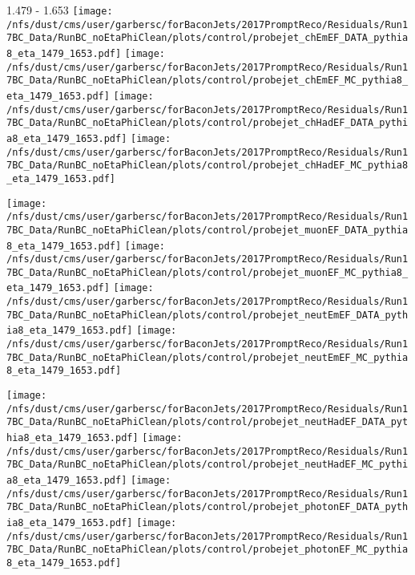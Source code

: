 \documentclass[t,compress]{beamer}
\begin{document}
\begin{frame}{1.479 - 1.653}
	\texttt{[image: /nfs/dust/cms/user/garbersc/forBaconJets/2017PromptReco/Residuals/Run17BC\_Data/RunBC\_noEtaPhiClean/plots/control/probejet\_chEmEF\_DATA\_pythia8\_eta\_1479\_1653.pdf]}
	\texttt{[image: /nfs/dust/cms/user/garbersc/forBaconJets/2017PromptReco/Residuals/Run17BC\_Data/RunBC\_noEtaPhiClean/plots/control/probejet\_chEmEF\_MC\_pythia8\_eta\_1479\_1653.pdf]}
	\texttt{[image: /nfs/dust/cms/user/garbersc/forBaconJets/2017PromptReco/Residuals/Run17BC\_Data/RunBC\_noEtaPhiClean/plots/control/probejet\_chHadEF\_DATA\_pythia8\_eta\_1479\_1653.pdf]}
	\texttt{[image: /nfs/dust/cms/user/garbersc/forBaconJets/2017PromptReco/Residuals/Run17BC\_Data/RunBC\_noEtaPhiClean/plots/control/probejet\_chHadEF\_MC\_pythia8\_eta\_1479\_1653.pdf]}
\newline

\vspace{-0.65cm}
	\texttt{[image: /nfs/dust/cms/user/garbersc/forBaconJets/2017PromptReco/Residuals/Run17BC\_Data/RunBC\_noEtaPhiClean/plots/control/probejet\_muonEF\_DATA\_pythia8\_eta\_1479\_1653.pdf]}
	\texttt{[image: /nfs/dust/cms/user/garbersc/forBaconJets/2017PromptReco/Residuals/Run17BC\_Data/RunBC\_noEtaPhiClean/plots/control/probejet\_muonEF\_MC\_pythia8\_eta\_1479\_1653.pdf]}
	\texttt{[image: /nfs/dust/cms/user/garbersc/forBaconJets/2017PromptReco/Residuals/Run17BC\_Data/RunBC\_noEtaPhiClean/plots/control/probejet\_neutEmEF\_DATA\_pythia8\_eta\_1479\_1653.pdf]}
	\texttt{[image: /nfs/dust/cms/user/garbersc/forBaconJets/2017PromptReco/Residuals/Run17BC\_Data/RunBC\_noEtaPhiClean/plots/control/probejet\_neutEmEF\_MC\_pythia8\_eta\_1479\_1653.pdf]}
\newline

\vspace{-0.65cm}
	\texttt{[image: /nfs/dust/cms/user/garbersc/forBaconJets/2017PromptReco/Residuals/Run17BC\_Data/RunBC\_noEtaPhiClean/plots/control/probejet\_neutHadEF\_DATA\_pythia8\_eta\_1479\_1653.pdf]}
	\texttt{[image: /nfs/dust/cms/user/garbersc/forBaconJets/2017PromptReco/Residuals/Run17BC\_Data/RunBC\_noEtaPhiClean/plots/control/probejet\_neutHadEF\_MC\_pythia8\_eta\_1479\_1653.pdf]}
	\texttt{[image: /nfs/dust/cms/user/garbersc/forBaconJets/2017PromptReco/Residuals/Run17BC\_Data/RunBC\_noEtaPhiClean/plots/control/probejet\_photonEF\_DATA\_pythia8\_eta\_1479\_1653.pdf]}
	\texttt{[image: /nfs/dust/cms/user/garbersc/forBaconJets/2017PromptReco/Residuals/Run17BC\_Data/RunBC\_noEtaPhiClean/plots/control/probejet\_photonEF\_MC\_pythia8\_eta\_1479\_1653.pdf]}
\end{frame}
\end{document}

